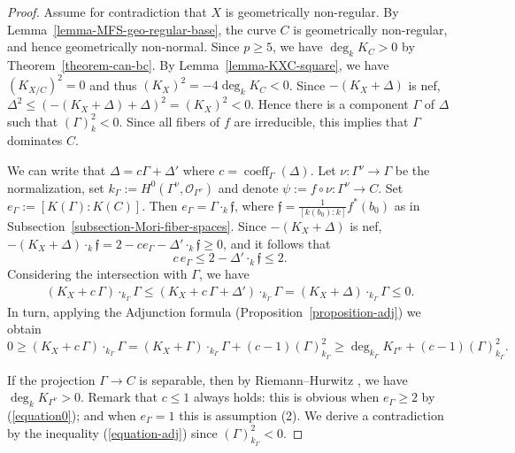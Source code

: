 \documentclass[reqno,oneside]{amsart}
\theoremstyle{definition}
\theoremstyle{plain}
\numberwithin{equation}{section}
\newcommand\coeff{\operatorname{coeff}}
\begin{document}
\begin{proof}
  Assume for contradiction that $X$ is geometrically non-regular.
  By Lemma~\ref{lemma-MFS-geo-regular-base}, the curve $C$ is geometrically non-regular, and hence geometrically non-normal.
  Since $p\ge5$, we have $\deg_k K_C > 0$ by Theorem~\ref{theorem-can-bc}.
  By Lemma~\ref{lemma-KXC-square}, we have $(K_{X/C})^2 = 0$ and thus $(K_X)^2=-4\deg_k K_C<0$.
  Since $-(K_X + \Delta)$ is nef, $\Delta^2 \le (-(K_X + \Delta)+\Delta)^2 = (K_X)^2 < 0$.
  Hence there is a component $\Gamma$ of $\Delta$ such that $(\Gamma)^2_k<0$.
  Since all fibers of $f$ are irreducible, this implies that $\Gamma$ dominates $C$.

 
 We can write that $\Delta = c\Gamma + \Delta'$ where $c=\coeff_\Gamma(\Delta)$. Let $\nu\colon\Gamma^\nu\to\Gamma$ be the normalization, set $k_\Gamma:=H^0(\Gamma^\nu,\mathcal O_{\Gamma^\nu})$ and denote $\psi:=f\circ\nu\colon\Gamma^\nu\to C$. Set $e_\Gamma :=[K(\Gamma):K(C)]$. Then  $e_\Gamma =\Gamma\cdot_k\mathfrak f$, where $\mathfrak f=\tfrac{1}{[k(b_0):k]}f^*(b_0)$ as in Subsection~\ref{subsection-Mori-fiber-spaces}. 
Since $-(K_X+\Delta)$ is nef, $ -(K_X+\Delta)\cdot_k \mathfrak f = 2 -  c e_{\Gamma} - \Delta' \cdot_k \mathfrak f \geq 0$, and it follows that
  \begin{equation}\label{equation0}
    c\,e_{\Gamma} \le 2 - \Delta' \cdot_k \mathfrak f \le2.
  \end{equation}
Considering the intersection with $\Gamma$, we have
    \begin{align}\label{equation1}
(K_X+  c\,\Gamma)\cdot_{k_\Gamma} \Gamma \leq (K_X+  c\,\Gamma + \Delta')\cdot_{k_\Gamma} \Gamma =  (K_X+\Delta)\cdot_{k_\Gamma} \Gamma \leq 0.
  \end{align}
  In turn, applying the Adjunction formula (Proposition~\ref{proposition-adj}) we obtain
  \begin{equation}\label{equation-adj}
0\geq (K_X+  c\,\Gamma)\cdot_{k_\Gamma} \Gamma = (K_X+ \Gamma)\cdot_{k_\Gamma} \Gamma + (c-1)  (\Gamma)^2_{k_\Gamma} \geq \deg_{k_\Gamma}K_{\Gamma^\nu} + (c-1)  (\Gamma)^2_{k_\Gamma}.
  \end{equation}
 
 If the projection $\Gamma \to C$ is separable, then by  Riemann--Hurwitz \cite[Theorem~7.4.16]{Liu-AGAC}, we have $\deg_kK_{\Gamma^\nu} >0$. Remark that $c\leq 1$ always holds: this is obvious when $e_\Gamma \geq 2$ by (\ref{equation0}); and when $e_\Gamma =1$ this is assumption (2). 
 We derive a contradiction by the inequality (\ref{equation-adj}) since  $(\Gamma)^2_{k_\Gamma}<0$.
 

\end{proof}
\end{document}
